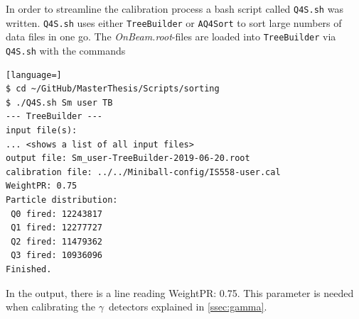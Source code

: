 \documentclass[twoside,english]{uiofysmaster/uiofysmaster}
\newcommand{\ga}{$\gamma$}
\let\orgautoref\autoref
\renewcommand{\autoref}
        {%
		 \def\sectionautorefname{Section}%
		 \def\subsectionautorefname{Section}%
		 \def\subsubsectionautorefname{Section}%
		 \def\chapterautorefname{Chapter}%
          \orgautoref}
\begin{document}
In order to streamline the calibration process a bash script called \texttt{Q4S.sh} was written. 
\texttt{Q4S.sh} uses either \texttt{TreeBuilder} or \texttt{AQ4Sort} to sort large numbers of data files in one go.
The \textit{OnBeam.root}-files are loaded into \texttt{TreeBuilder} via \texttt{Q4S.sh} with the commands
\begin{lstlisting}[language=]
$ cd ~/GitHub/MasterThesis/Scripts/sorting 
$ ./Q4S.sh Sm user TB
--- TreeBuilder ---
input file(s):
... <shows a list of all input files>
output file: Sm_user-TreeBuilder-2019-06-20.root
calibration file: ../../Miniball-config/IS558-user.cal
WeightPR: 0.75
Particle distribution:
 Q0 fired: 12243817
 Q1 fired: 12277727
 Q2 fired: 11479362
 Q3 fired: 10936096
Finished.
\end{lstlisting}
In the output, there is a line reading WeightPR: 0.75. 
This parameter is needed when calibrating the \ga\ detectors explained in \autoref{ssec:gamma}. 
\end{document}
